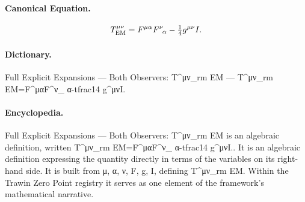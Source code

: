 \paragraph{Canonical Equation.}
\[
T^{\mu\nu}_{\rm EM}=F^{\mu\alpha}{F^\nu}_{\!\alpha}-\tfrac14 g^{\mu\nu}I.
\]

\paragraph{Dictionary.}
Full Explicit Expansions — Both Observers: T\textasciicircum{}μν\_rm EM — T\textasciicircum{}μν\_rm EM=F\textasciicircum{}μαF\textasciicircum{}ν\_ α-tfrac14 g\textasciicircum{}μνI.

\paragraph{Encyclopedia.}
Full Explicit Expansions — Both Observers: T\textasciicircum{}μν\_rm EM is an algebraic definition, written T\textasciicircum{}μν\_rm EM=F\textasciicircum{}μαF\textasciicircum{}ν\_ α-tfrac14 g\textasciicircum{}μνI.. It is an algebraic definition expressing the quantity directly in terms of the variables on its right-hand side. It is built from μ, α, ν, F, g, I, defining T\textasciicircum{}μν\_rm EM. Within the Trawin Zero Point registry it serves as one element of the framework's mathematical narrative.
